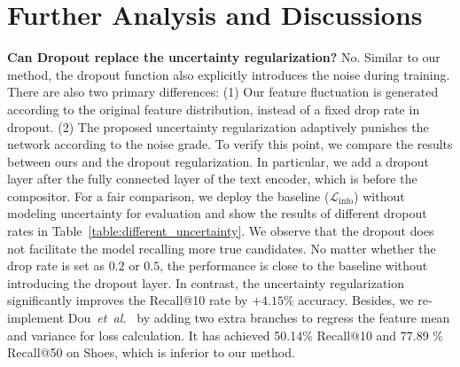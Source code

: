 \documentclass[10pt,twocolumn,letterpaper]{article}
\def\etal{\emph{et~al.}}
\begin{document}
\section{Further Analysis and Discussions}
\noindent\textbf{Can Dropout replace the uncertainty regularization?} \label{dropout_vs_uncertainty}
No. Similar to our method, the dropout function also explicitly introduces the noise during training. There are also two primary differences: (1) Our feature fluctuation is generated according to the original feature distribution, instead of a fixed drop rate in dropout. (2) The proposed uncertainty regularization adaptively punishes the network according to the noise grade. 
To verify this point, we compare the results between ours and the dropout regularization. In particular, we add a dropout layer after the fully connected layer of the text encoder, which is before the compositor. 
For a fair comparison, we deploy the baseline ($\mathcal{L}_{\mathrm{info}}$) without modeling uncertainty for evaluation and show the results of different dropout rates in Table~\ref{table:different_uncertainty}. 
We observe that the dropout does not facilitate the model recalling more true candidates. No matter whether the drop rate is set as $0.2$ or $0.5$, the performance is close to the baseline without introducing the dropout layer. In contrast, the uncertainty regularization significantly improves the Recall@10 rate by $+4.15\%$ accuracy.
Besides, we re-implement Dou~\etal~\cite{dou2022reliability} by adding two extra branches to regress the feature mean and variance for loss calculation. It has achieved 50.14\% Recall@10 and 77.89 \% Recall@50 on Shoes, which is inferior to our method. 
\end{document}
